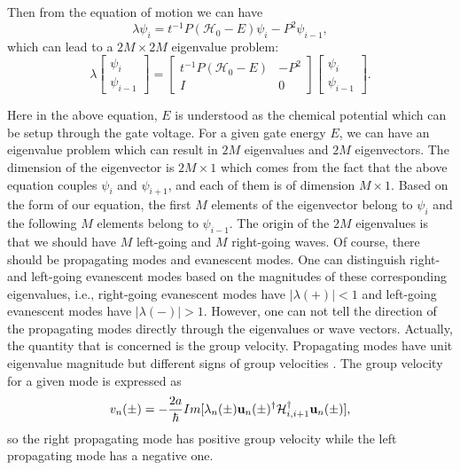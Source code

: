 \documentclass[journal]{IEEEtran}
\begin{document}
Then from the equation of motion we can have
\begin{equation*}
    \lambda\psi_i=t^{-1}P(\mathcal{H}_0-E)\psi_i-P^2\psi_{i-1},
\end{equation*}
which can lead to a $2M\times2M$ eigenvalue problem:
\begin{equation}
    \lambda\left[
        \begin{array}{c}
            \psi_i \\ \psi_{i-1}
        \end{array}
    \right]=\left[
        \begin{array}{cc}
            t^{-1}P(\mathcal{H}_0-E) & -P^2 \\ I & 0
    \end{array}\right]
    \left[ \begin{array}{c}
            \psi_i \\ \psi_{i-1}
    \end{array}\right].
    \label{eq:eig}
\end{equation}

Here in the above equation, $E$ is understood as the chemical potential which can be setup through the gate voltage. For
a given gate energy $E$, we can have an eigenvalue problem which can result in $2M$ eigenvalues and $2M$ eigenvectors.
The dimension of the eigenvector is $2M\times1$ which comes from the fact that the above equation couples $\psi_i$ and
$\psi_{i+1}$, and each of them is of dimension $M\times1$. Based on the form of our equation, the first $M$ elements
of the eigenvector belong to $\psi_i$ and the following $M$ elements belong to $\psi_{i-1}$. The origin of the
$2M$ eigenvalues is that we should have $M$ left-going and $M$ right-going waves. Of course, there should be propagating
modes and evanescent modes. One can distinguish right- and left-going evanescent modes based on the magnitudes of these
corresponding eigenvalues, i.e., right-going evanescent modes have $|\lambda(+)|<1$ and left-going evanescent modes have
$|\lambda(-)|>1$. However, one can not tell the direction of the propagating modes directly through the eigenvalues or
wave vectors. Actually, the quantity that is concerned is the group velocity. Propagating modes have unit eigenvalue
magnitude but different signs of group velocities \cite{KBKZK:2005,BS:1989}. The group velocity for a given mode is
expressed as \cite{KBKZK:2005}
\begin{equation} v_n(\pm)=-\frac{2a}{\hbar}Im[\lambda_n(\pm){\bf
    u}_n(\pm)^\dagger\mathcal{H}_{i,i+1}^\dagger{\bf u}_n(\pm)],
    \label{}
\end{equation}
so the right propagating mode has positive group velocity while the left propagating mode has a negative one.
\end{document}

